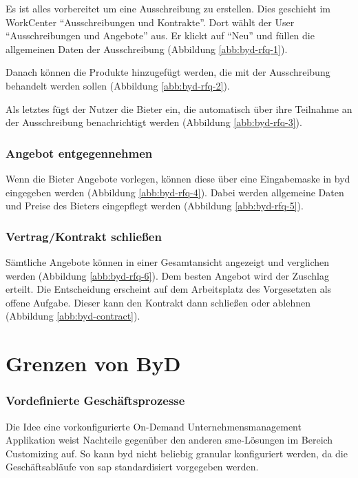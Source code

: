 Es ist alles vorbereitet um eine Ausschreibung zu erstellen. Dies geschieht im WorkCenter "`Ausschreibungen und Kontrakte"'. Dort wählt der User "`Ausschreibungen und Angebote"' aus. Er klickt auf "`Neu"' und füllen die allgemeinen Daten der Ausschreibung (Abbildung \ref{abb:byd-rfq-1}). 

Danach können die Produkte hinzugefügt werden, die mit der Ausschreibung behandelt werden sollen (Abbildung \ref{abb:byd-rfq-2}).

Als letztes fügt der Nutzer die Bieter ein, die automatisch über ihre Teilnahme an der Ausschreibung benachrichtigt werden (Abbildung \ref{abb:byd-rfq-3}).

\subsubsection{Angebot entgegennehmen}

Wenn die Bieter Angebote vorlegen, können diese über eine Eingabemaske in \gls{byd} eingegeben werden (Abbildung \ref{abb:byd-rfq-4}). Dabei werden allgemeine Daten und Preise des Bieters eingepflegt werden (Abbildung \ref{abb:byd-rfq-5}).

\subsubsection{Vertrag/Kontrakt schließen}

Sämtliche Angebote können in einer Gesamtansicht angezeigt und verglichen werden (Abbildung \ref{abb:byd-rfq-6}). Dem besten Angebot wird der Zuschlag erteilt. 
Die Entscheidung erscheint auf dem Arbeitsplatz des Vorgesetzten als offene Aufgabe. Dieser kann den Kontrakt dann schließen oder ablehnen (Abbildung \ref{abb:byd-contract}).

\section{Grenzen von ByD}

\subsubsection{Vordefinierte Geschäftsprozesse}

Die Idee eine vorkonfigurierte On-Demand Unternehmensmanagement Applikation weist Nachteile gegenüber den anderen \gls{sme}-Lösungen im Bereich Customizing auf. So kann \gls{byd} nicht beliebig granular konfiguriert werden, da die Geschäftsabläufe von \gls{sap} standardisiert vorgegeben werden.

